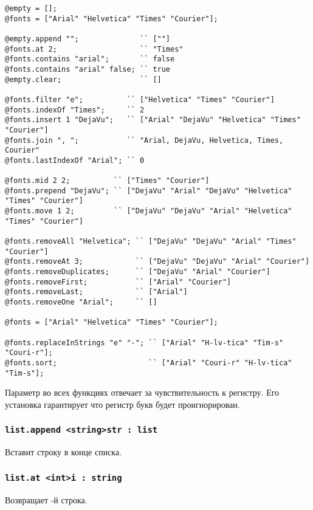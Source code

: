 \documentclass[a4paper, 14pt]{extarticle}
\begin{document}
\begin{lstlisting}[caption=Методы класса list, label=listmethods]
@empty = [];
@fonts = ["Arial" "Helvetica" "Times" "Courier"];

@empty.append "";              `` [""]
@fonts.at 2;                   `` "Times"
@fonts.contains "arial";       `` false
@fonts.contains "arial" false; `` true
@empty.clear;                  `` []

@fonts.filter "e";          `` ["Helvetica" "Times" "Courier"]
@fonts.indexOf "Times";     `` 2
@fonts.insert 1 "DejaVu";   `` ["Arial" "DejaVu" "Helvetica" "Times" "Courier"]
@fonts.join ", ";           `` "Arial, DejaVu, Helvetica, Times, Courier"
@fonts.lastIndexOf "Arial"; `` 0

@fonts.mid 2 2;          `` ["Times" "Courier"]
@fonts.prepend "DejaVu"; `` ["DejaVu" "Arial" "DejaVu" "Helvetica" "Times" "Courier"]
@fonts.move 1 2;         `` ["DejaVu" "DejaVu" "Arial" "Helvetica" "Times" "Courier"]

@fonts.removeAll "Helvetica"; `` ["DejaVu" "DejaVu" "Arial" "Times" "Courier"]
@fonts.removeAt 3;            `` ["DejaVu" "DejaVu" "Arial" "Courier"]
@fonts.removeDuplicates;      `` ["DejaVu" "Arial" "Courier"]
@fonts.removeFirst;           `` ["Arial" "Courier"]
@fonts.removeLast;            `` ["Arial"]
@fonts.removeOne "Arial";     `` []

@fonts = ["Arial" "Helvetica" "Times" "Courier"];

@fonts.replaceInStrings "e" "-"; `` ["Arial" "H-lv-tica" "Tim-s" "Couri-r"];
@fonts.sort;                     `` ["Arial" "Couri-r" "H-lv-tica" "Tim-s"];
\end{lstlisting}

Параметр  во всех функциях отвечает за чувствительность к регистру. Его установка гарантирует что регистр букв будет проигнорирован.

\subsubsection{\lstinline|list.append <string>str : list|}

Вставит строку  в конце списка.

\subsubsection{\lstinline|list.at <int>i : string|}

Возвращает -й строка.
\end{document}
